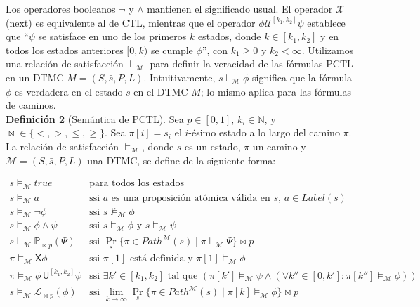 \documentclass[runningheads]{llncs}
\begin{document}
Los operadores booleanos $\neg$ y $\land$ mantienen el significado usual. El operador $\mathcal{X}$ (next) es equivalente al de CTL, mientras que el operador $\phi \mathcal{U}^{[k_1,k_2]} \psi$ establece que “$\psi$ se satisface en uno de los primeros $k$ estados, donde $k \in [k_1, k_2]$ y en todos los estados anteriores $[0, k)$ se cumple $\phi$”, con $k_1 \geq 0$ y $k_2 < \infty$.
Utilizamos una relación de satisfacción $\models_\mathcal{M}$ para definir la veracidad de las fórmulas PCTL en un DTMC $M = (S, \bar{s}, P, L)$. Intuitivamente, $s\models_\mathcal{M}\phi$ significa que la fórmula $\phi$ es verdadera en el estado $s$ en el DTMC $M$; lo mismo aplica para las fórmulas de caminos.\\

\textbf{Definición 2} (Semántica de PCTL). Sea $p \in [0,1]$, $k_i \in \mathbb{N}$, y $\bowtie \in \{<, >, \leq, \geq\}$. Sea $\pi[i] = s_i$ el $i$-ésimo estado a lo largo del camino $\pi$. La relación de satisfacción $\models_\mathcal{M}$, donde $s$ es un estado, $\pi$ un camino y $\mathcal{M} = (S, \bar{s}, P, L)$ una DTMC, se define de la siguiente forma:

\[
\begin{array}{ll}
s \models_\mathcal{M} \mathit{true} & \text{para todos los estados} \\
s \models_\mathcal{M} a & \text{ssi $a$ es una proposición atómica válida en $s$, $a \in Label(s)$} \\
s \models_\mathcal{M} \neg \phi & \text{ssi } s \not\models_\mathcal{M} \phi \\
s \models_\mathcal{M} \phi \land \psi & \text{ssi } s \models_\mathcal{M} \phi \text{ y } s \models_\mathcal{M} \psi \\
s \models_\mathcal{M} \mathbb{P}_{\bowtie p}(\Psi) & \text{ssi } \Pr_s\{\pi \in Path^\mathcal{M}(s) \mid \pi \models_\mathcal{M} \Psi\} \bowtie p \\
\pi \models_\mathcal{M} \mathsf{X} \phi & \text{ssi } \pi[1] \text{ está definida y } \pi[1] \models_\mathcal{M} \phi \\
\pi \models_\mathcal{M} \phi \, \mathsf{U}^{[k_1,k_2]} \psi & \text{ssi } \exists k' \in [k_1,k_2] \text{ tal que } (\pi[k'] \models_\mathcal{M} \psi \land (\forall k'' \in [0,k']: \pi[k''] \models_\mathcal{M} \phi)) \\
s \models_\mathcal{M} \mathcal{L}_{\bowtie p}(\phi) & \text{ssi } \lim_{k \to \infty} \Pr_s\{\pi \in Path^\mathcal{M}(s) \mid \pi[k] \models_\mathcal{M} \phi\} \bowtie p
\end{array}
\]
\end{document}
